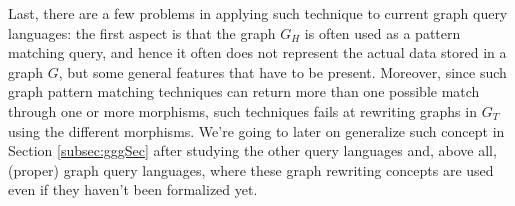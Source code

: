 Last, there are a few problems in applying such technique to current graph query languages: the first aspect is that the graph $G_H$ is often used as a pattern matching query, and hence it often does not represent the actual data stored in a graph $G$, but some general features that have to be present. Moreover, since such graph pattern matching techniques can return more than one possible match through one or more morphisms, such techniques fails at rewriting graphs in $G_T$ using the different morphisms. We're going to later on generalize such concept in Section \ref{subsec:gggSec} after studying the other query languages and, above all, (proper) graph query languages, where these graph rewriting concepts are used even if they haven't been formalized yet.